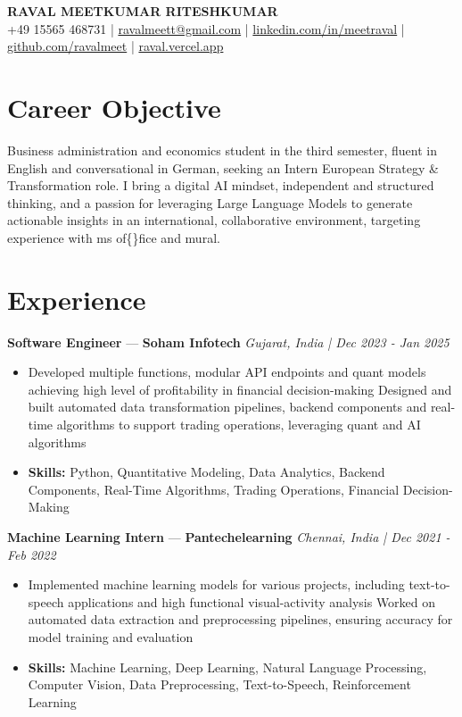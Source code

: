 \documentclass[a4paper,10pt]{article}
\begin{document}
\begin{center}
  {\Large\bfseries RAVAL MEETKUMAR RITESHKUMAR}\\[2pt]
  {\small +49 15565 468731 \;|\; \href{mailto:ravalmeett@gmail.com}{ravalmeett@gmail.com} \;|\; \href{https://www.linkedin.com/in/meetraval/}{linkedin.com/in/meetraval} \;|\; \href{https://github.com/ravalmeet}{github.com/ravalmeet} \;|\; \href{https://raval.vercel.app/}{raval.vercel.app}}
\end{center}
\vspace{-3pt}

\section*{Career Objective}
Business administration and economics student in the third semester, fluent in English and conversational in German, seeking an Intern European Strategy \& Transformation role. I bring a digital AI mindset, independent and structured thinking, and a passion for leveraging Large Language Models to generate actionable insights in an international, collaborative environment, targeting experience with ms of\{\}fice and mural.\par

\section*{Experience}
\textbf{Software Engineer} — \textbf{Soham Infotech} \hfill \textit{Gujarat, India \;|\; Dec 2023 - Jan 2025}\par
\vspace{1pt}
\begin{itemize}
  \item Developed multiple functions, modular API endpoints and quant models achieving high level of profitability in financial decision-making Designed and built automated data transformation pipelines, backend components and real-time algorithms to support trading operations, leveraging quant and AI algorithms
  \item \textbf{Skills:} Python, Quantitative Modeling, Data Analytics, Backend Components, Real-Time Algorithms, Trading Operations, Financial Decision-Making
\end{itemize}
\vspace{3pt}
\textbf{Machine Learning Intern} — \textbf{Pantechelearning} \hfill \textit{Chennai, India \;|\; Dec 2021 - Feb 2022}\par
\vspace{1pt}
\begin{itemize}
  \item Implemented machine learning models for various projects, including text-to-speech applications and high functional visual-activity analysis Worked on automated data extraction and preprocessing pipelines, ensuring accuracy for model training and evaluation
  \item \textbf{Skills:} Machine Learning, Deep Learning, Natural Language Processing, Computer Vision, Data Preprocessing, Text-to-Speech, Reinforcement Learning
\end{itemize}
\end{document}
